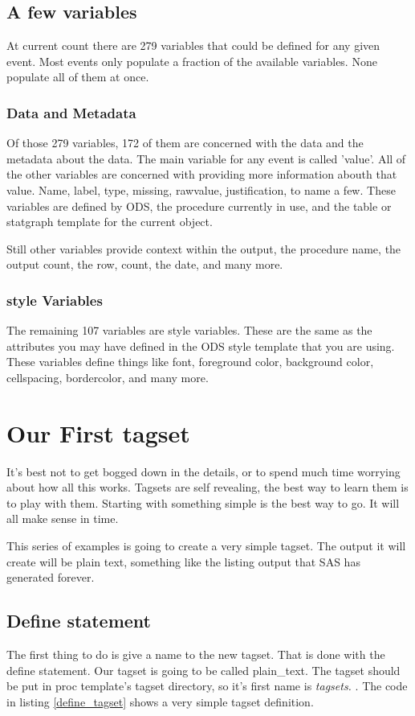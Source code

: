 \subsection{A few variables}
At current count there are 279 variables that could
be defined for any given event.  Most events only
populate a fraction of the available variables.  None
populate all of them at once.


\subsubsection{Data and Metadata}
Of those 279 variables, 172 of them are concerned with
the data and the metadata about the data.  The main variable
for any event is called 'value'.  All of the other variables
are concerned with providing more information abouth that
value.  Name, label, type, missing, rawvalue, justification,
to name a few.  These variables are defined by ODS, the procedure
currently in use, and the table or statgraph template for the
current object.

Still other variables provide context within the output,
the procedure name, the output count, the row, count, the date,
and many more.

\subsubsection{style Variables}
The remaining 107 variables are style variables.  These are
the same as the attributes you may have defined in the ODS
style template that you are using.  These variables define things
like font, foreground color, background color, cellspacing, bordercolor,
and many more.

\section{Our First tagset}
It's best not to get bogged down in the details, or to spend much
time worrying about how all this works.  Tagsets are self revealing,
the best way to learn them is to play with them. Starting with something 
simple is the best way to go.  It will all make sense in time.

This series of examples is going to create a very simple tagset. The output it will create
will be plain text, something like the listing output that SAS has 
generated forever.

\subsection{Define statement}
The first thing to do is give a name to the new tagset.  That is done 
with the define statement.  Our tagset is going to be called
plain\_text.  The tagset should be put in proc template's tagset directory,
so it's first name is {\itshape tagsets.} .
The code in listing \vref{define_tagset} shows a very simple tagset definition.

